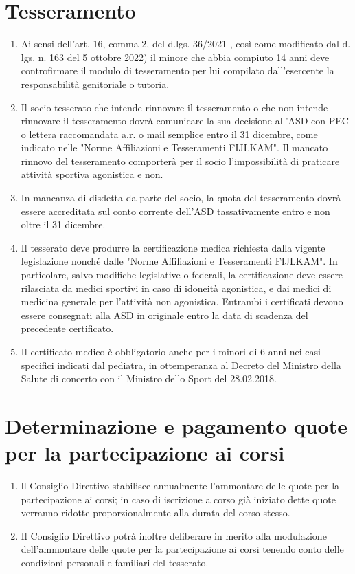 \documentclass{djtsasddoc}
\begin{document}
	\section{Tesseramento}
	\begin{enumerate}
		\item Ai sensi dell'art. 16, comma 2, del d.lgs. 36/2021 , così come modificato dal d. lgs. n. 163 del 5 ottobre 2022) il minore che abbia compiuto 14 anni deve controfirmare il modulo di tesseramento per lui compilato dall'esercente la responsabilità genitoriale o tutoria. 
		\item Il socio tesserato che intende rinnovare il tesseramento o che non intende rinnovare il tesseramento dovrà comunicare la sua decisione all'ASD con PEC o lettera raccomandata a.r. o mail semplice entro il 31 dicembre, come indicato nelle "Norme Affiliazioni e Tesseramenti FIJLKAM". Il mancato rinnovo del tesseramento comporterà per il socio l'impossibilità di praticare attività sportiva agonistica e non. 
		\item In mancanza di disdetta da parte del socio, la quota del tesseramento dovrà essere accreditata sul conto corrente dell'ASD  tassativamente entro e non oltre il 31 dicembre.
		\item Il tesserato deve produrre la certificazione medica richiesta dalla vigente legislazione nonché dalle "Norme Affiliazioni e Tesseramenti FIJLKAM". In particolare, salvo modifiche legislative o federali, la certificazione deve essere rilasciata da medici sportivi in caso di idoneità agonistica, e dai medici di medicina generale per l'attività non agonistica. Entrambi i certificati devono essere consegnati alla ASD in originale entro la data di scadenza del precedente certificato.
		\item Il certificato medico è obbligatorio anche per i minori di 6 anni nei casi specifici indicati dal pediatra, in ottemperanza al Decreto del Ministro della Salute di concerto con il Ministro dello Sport del 28.02.2018.
	\end{enumerate}
	
	\section{Determinazione e pagamento quote per la partecipazione ai corsi}
	\begin{enumerate}
		\item ll Consiglio Direttivo stabilisce annualmente l'ammontare delle quote per la partecipazione ai corsi; in caso di iscrizione a corso già iniziato dette quote verranno ridotte proporzionalmente alla durata del corso stesso. 
		\item Il Consiglio Direttivo potrà inoltre deliberare in merito alla modulazione dell'ammontare  delle quote per la partecipazione ai corsi tenendo conto delle condizioni personali e familiari del tesserato.
	\end{enumerate}
	
\end{document}
